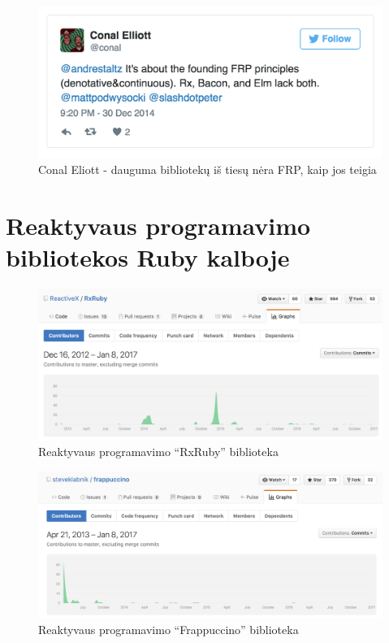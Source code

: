 \documentclass{VUMIFPSmagistrinis}
\begin{document}
\begin{figure}[H]
    \centering
    \includegraphics[scale=0.5]{img/not_frp7}
    \caption{Conal Eliott - dauguma bibliotekų iš tiesų nėra FRP, kaip jos teigia}
    \label{img:not_frp7}
\end{figure}

\section{Reaktyvaus programavimo bibliotekos Ruby kalboje}

\begin{figure}[H]
    \centering
    \includegraphics[scale=0.35]{img/rxruby}
    \caption{Reaktyvaus programavimo ``RxRuby'' biblioteka}
    \label{img:rxruby}
\end{figure}

\begin{figure}[H]
    \centering
    \includegraphics[scale=0.35]{img/frappuccino}
    \caption{Reaktyvaus programavimo ``Frappuccino'' biblioteka}
    \label{img:frappuccino}
\end{figure}
\end{document}
